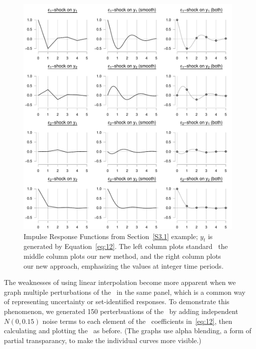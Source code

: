 \documentclass[12pt,fleqn]{article}
\begin{document}
\begin{figure}[t]
  \centering
  \includegraphics{graphs/numeric.pdf}
  \caption{Impulse Response Functions from Section~\ref{S3.1} example;
    $y_t$ is generated by Equation~\eqref{eq:12}. The left column
    plots standard \IRFs\, the middle column plots our new method, and
    the right column plots our new approach, emphasizing the values at
    integer time periods.}
  \label{fig:3}
\end{figure}

The weaknesses of using linear interpolation become more apparent when
we graph multiple perturbations of the \IRFs\ in the same panel, which
is a common way of representing uncertainty or set-identified
responses. To demonstrate this phenomenon, we generated 150
perterbuations of the \IRFs\ by adding independent $N(0, 0.15)$ noise
terms to each element of the \VAR\ coefficients in~\eqref{eq:12}, then
calculating and plotting the \IRFs\ as before. (The graphs use alpha
blending, a form of partial transparancy, to make the individual
curves more visible.)
\end{document}
